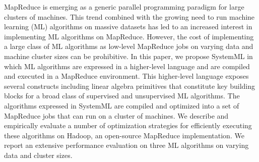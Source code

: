 MapReduce is emerging as a generic parallel programming paradigm for large clusters of
machines. This trend combined with the growing need to run machine learning (ML) algorithms on
massive datasets has led to an increased interest in implementing ML algorithms on
MapReduce. However, the cost of implementing a large class of ML algorithms as low-level MapReduce
jobs on varying data and machine cluster sizes can be prohibitive.  In this paper, we propose
SystemML in which ML algorithms are expressed in a higher-level language and are compiled and
executed in a MapReduce environment.  This higher-level language exposes several constructs
including linear algebra primitives that constitute key building blocks for a broad class of
supervised and unsupervised ML algorithms. The algorithms expressed in SystemML are compiled and
optimized into a set of MapReduce jobs that can run on a cluster of machines. We describe and
empirically evaluate a number of optimization strategies for efficiently executing these algorithms
on Hadoop, an open-source MapReduce implementation. We report an extensive performance evaluation on
three ML algorithms on varying data and cluster sizes.


